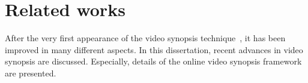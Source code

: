 \documentclass[11pt]{hyu_thesis}
\begin{document}
\section{Related works}
\label{sec:intro:related}
After the very first appearance of the video synopsis technique~\cite{Rav-Acha2006}, it has been improved in many different aspects. In this dissertation, recent advances in video synopsis are discussed. Especially, details of the online video synopsis framework are presented.

\begin{figure}
	\centering
	\\
\end{figure}
\end{document}
